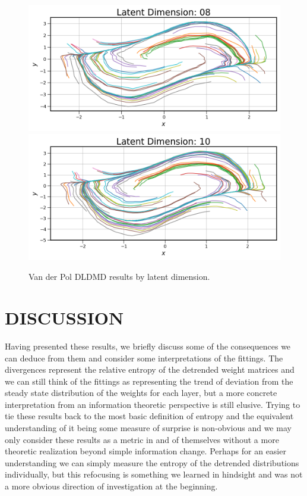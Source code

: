 \begin{figure}[!htbp]
\begin{minipage}{.5\textwidth}
        \includegraphics[width=\textwidth]{"../Figures/van_der_pol_trajectories_08.png"} 
        \includegraphics[width=\textwidth]{"../Figures/van_der_pol_trajectories_10.png"} 
    \end{minipage}
    \caption{Van der Pol DLDMD results by latent dimension.}
    \label{fig:van der pol DLDMD results}
\end{figure}

\chapter{DISCUSSION}
\label{chap:discussion}
Having presented these results, we briefly discuss some of the consequences we can deduce from 
them and consider some interpretations of the fittings. The divergences represent the relative
entropy of the detrended weight matrices and we can still think of the fittings as representing
the trend of deviation from the steady state distribution of the weights for each layer, but a more
concrete interpretation from an information theoretic perspective is still elusive. Trying to tie 
these results back to the most basic definition of entropy and the equivalent understanding of it 
being some measure of surprise is non-obvious and we may only consider these results as a metric in
and of themselves without a more theoretic realization beyond simple information change. Perhaps for 
an easier understanding we can simply measure the entropy of the detrended distributions individually,
but this refocusing is something we learned in hindsight and was not a more obvious direction of 
investigation at the beginning.

